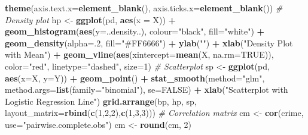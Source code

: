 \documentclass[]{article}
\newenvironment{Shaded}{\begin{snugshade}}{\end{snugshade}}
\newcommand{\CommentTok}[1]{\textcolor[rgb]{0.56,0.35,0.01}{\textit{#1}}}
\newcommand{\DataTypeTok}[1]{\textcolor[rgb]{0.13,0.29,0.53}{#1}}
\newcommand{\DecValTok}[1]{\textcolor[rgb]{0.00,0.00,0.81}{#1}}
\newcommand{\KeywordTok}[1]{\textcolor[rgb]{0.13,0.29,0.53}{\textbf{#1}}}
\newcommand{\NormalTok}[1]{#1}
\newcommand{\OperatorTok}[1]{\textcolor[rgb]{0.81,0.36,0.00}{\textbf{#1}}}
\newcommand{\OtherTok}[1]{\textcolor[rgb]{0.56,0.35,0.01}{#1}}
\newcommand{\StringTok}[1]{\textcolor[rgb]{0.31,0.60,0.02}{#1}}
\begin{document}
\begin{Shaded}
\begin{Highlighting}[]
\StringTok{  }\KeywordTok{theme}\NormalTok{(}\DataTypeTok{axis.text.x=}\KeywordTok{element_blank}\NormalTok{(), }\DataTypeTok{axis.ticks.x=}\KeywordTok{element_blank}\NormalTok{())}
\CommentTok{# Density plot}
\NormalTok{hp <-}\StringTok{ }\KeywordTok{ggplot}\NormalTok{(pd, }\KeywordTok{aes}\NormalTok{(}\DataTypeTok{x =}\NormalTok{ X)) }\OperatorTok{+}\StringTok{ }
\StringTok{  }\KeywordTok{geom_histogram}\NormalTok{(}\KeywordTok{aes}\NormalTok{(}\DataTypeTok{y=}\NormalTok{..density..), }\DataTypeTok{colour=}\StringTok{"black"}\NormalTok{, }\DataTypeTok{fill=}\StringTok{"white"}\NormalTok{) }\OperatorTok{+}
\StringTok{  }\KeywordTok{geom_density}\NormalTok{(}\DataTypeTok{alpha=}\NormalTok{.}\DecValTok{2}\NormalTok{, }\DataTypeTok{fill=}\StringTok{"#FF6666"}\NormalTok{) }\OperatorTok{+}\StringTok{ }
\StringTok{  }\KeywordTok{ylab}\NormalTok{(}\StringTok{""}\NormalTok{) }\OperatorTok{+}\StringTok{ }\KeywordTok{xlab}\NormalTok{(}\StringTok{"Density Plot with Mean"}\NormalTok{) }\OperatorTok{+}
\StringTok{  }\KeywordTok{geom_vline}\NormalTok{(}\KeywordTok{aes}\NormalTok{(}\DataTypeTok{xintercept=}\KeywordTok{mean}\NormalTok{(X, }\DataTypeTok{na.rm=}\OtherTok{TRUE}\NormalTok{)), }
             \DataTypeTok{color=}\StringTok{"red"}\NormalTok{, }\DataTypeTok{linetype=}\StringTok{"dashed"}\NormalTok{, }\DataTypeTok{size=}\DecValTok{1}\NormalTok{)}
\CommentTok{# Scatterplot}
\NormalTok{sp <-}\StringTok{ }\KeywordTok{ggplot}\NormalTok{(pd, }\KeywordTok{aes}\NormalTok{(}\DataTypeTok{x=}\NormalTok{X, }\DataTypeTok{y=}\NormalTok{Y)) }\OperatorTok{+}\StringTok{ }
\StringTok{  }\KeywordTok{geom_point}\NormalTok{() }\OperatorTok{+}\StringTok{   }
\StringTok{  }\KeywordTok{stat_smooth}\NormalTok{(}\DataTypeTok{method=}\StringTok{"glm"}\NormalTok{, }\DataTypeTok{method.args=}\KeywordTok{list}\NormalTok{(}\DataTypeTok{family=}\StringTok{"binomial"}\NormalTok{), }\DataTypeTok{se=}\OtherTok{FALSE}\NormalTok{) }\OperatorTok{+}
\StringTok{  }\KeywordTok{xlab}\NormalTok{(}\StringTok{"Scatterplot with Logistic Regression Line"}\NormalTok{)}
\KeywordTok{grid.arrange}\NormalTok{(bp, hp, sp, }\DataTypeTok{layout_matrix=}\KeywordTok{rbind}\NormalTok{(}\KeywordTok{c}\NormalTok{(}\DecValTok{1}\NormalTok{,}\DecValTok{2}\NormalTok{,}\DecValTok{2}\NormalTok{),}\KeywordTok{c}\NormalTok{(}\DecValTok{1}\NormalTok{,}\DecValTok{3}\NormalTok{,}\DecValTok{3}\NormalTok{)))}
\CommentTok{# Correlation matrix}
\NormalTok{cm <-}\StringTok{ }\KeywordTok{cor}\NormalTok{(crime, }\DataTypeTok{use=}\StringTok{"pairwise.complete.obs"}\NormalTok{)}
\NormalTok{cm <-}\StringTok{ }\KeywordTok{round}\NormalTok{(cm, }\DecValTok{2}\NormalTok{)}

\end{Highlighting}
\end{Shaded}
\end{document}
